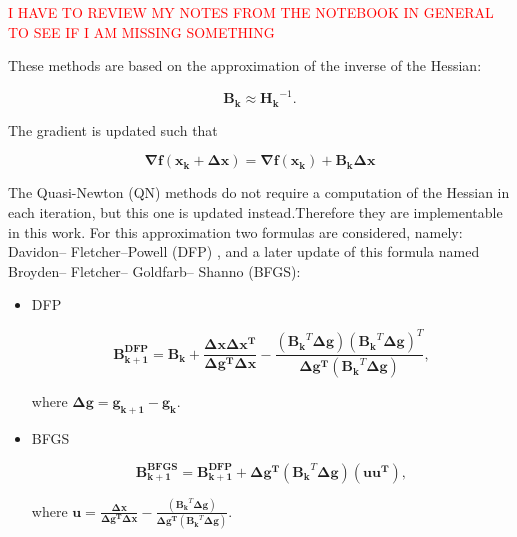 \textcolor{red}{I HAVE TO REVIEW MY NOTES FROM THE NOTEBOOK IN GENERAL TO SEE IF I AM MISSING SOMETHING	}
 
These methods are based on the approximation of the inverse of the Hessian:

\begin{equation}
\mathbf{B_k} \approx \mathbf{H_k}^{-1}. 
\end{equation}

The gradient is updated such that

\begin{equation}
\mathbf{\nabla f(x_k + \Delta x)} = \mathbf{\nabla f(x_k) + \mathbf{B_k}\mathbf{ \Delta x }} 
\end{equation}



The Quasi-Newton (QN) methods do not require a computation of the Hessian in each iteration, but this one is updated instead.Therefore they are implementable in this work.
For this approximation two formulas are considered, namely: Davidon–
Fletcher–Powell (DFP) \cite{DFP}, and a later update of this formula named Broyden– Fletcher– Goldfarb– Shanno (BFGS)\cite{BFGS}:

\begin{itemize}
	\item DFP
	
	\begin{equation}
	 \mathbf{B_{k+1}^{DFP}} =  \mathbf{B_k} + 	\frac{\mathbf{\Delta x}   \mathbf{\Delta x^{T}}}		
	 {\mathbf{\Delta g^{T}}  \mathbf{\Delta x}  } -  \frac{(\mathbf{B_{k}}^{T}  \mathbf{\Delta g}) (\mathbf{B_{k}}^{T}  \mathbf{\Delta g})^{T}  }
	 {\mathbf{\Delta g^{T}} (\mathbf{B_{k}}^{T}  \mathbf{\Delta g})   },
	 \label{eq:DFP}
	\end{equation}
	
	where $\mathbf{\Delta g} = \mathbf{g_{k+1} }- \mathbf{g_k} $.
	
	\item BFGS
	
	\begin{equation}
	\mathbf{B_{k+1}^{BFGS}} =  \mathbf{B_{k+1}^{DFP}} + \mathbf{\Delta g^{T}}(\mathbf{B_{k}}^{T}  \mathbf{\Delta g})(\mathbf{u}  \mathbf{u^{T}})	,
	\end{equation}	
	
	where $\mathbf{u} = \frac{\mathbf{\Delta x}}		
	{\mathbf{\Delta g^{T}}  \mathbf{\Delta x}} - \frac{(\mathbf{B_{k}}^{T}  \mathbf{\Delta g})   }
	{\mathbf{\Delta g^{T}} (\mathbf{B_{k}}^{T}  \mathbf{\Delta g})   }$.
	

\end{itemize}


